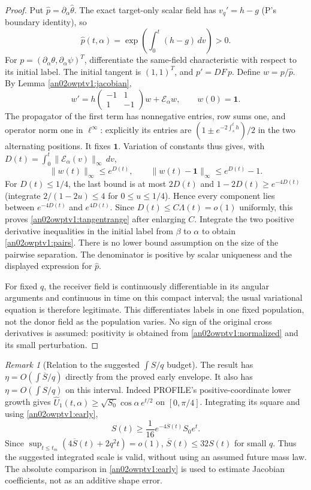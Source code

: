 \documentclass[11pt]{article}
\theoremstyle{remark}\newtheorem{remark}[theorem]{Remark}
\newcommand{\dd}{\,d}
\begin{document}
\begin{proof}
Put $\widehat p=\partial_\alpha\widehat\theta$.
The exact target-only scalar field has
$v_q'=h-g$ (P's boundary identity), so
\[
 \widehat p(t,\alpha)=\exp\!\left(\int_0^t(h-g)\dd v\right)>0.
\]
For $p=(\partial_\alpha\theta,\partial_\alpha\psi)^T$,
differentiate the same-field characteristic with respect to its
initial label. The initial tangent is $(1,1)^T$, and
$p'=DF\,p$. Define $w=p/\widehat p$. By Lemma
\ref{an02owptv1:jacobian},
\begin{equation}\label{an02owptv1:normalized}
 w'=h\begin{pmatrix}-1&1\\1&-1\end{pmatrix}w+
 \mathcal E_\alpha w,\qquad w(0)=\boldsymbol1.
\end{equation}
The propagator of the first term has nonnegative entries, row sums
one, and operator norm one in $\ell^\infty$: explicitly its entries
are $(1\pm e^{-2\int_s^t h})/2$ in the two alternating positions.
It fixes $\boldsymbol1$. Variation of constants thus gives, with
$D(t)=\int_0^t\|\mathcal E_\alpha(v)\|_\infty\dd v$,
\[
 \|w(t)\|_\infty\le e^{D(t)},\qquad
 \|w(t)-\boldsymbol1\|_\infty\le e^{D(t)}-1.
\]
For $D(t)\le1/4$, the last bound is at most $2D(t)$ and
$1-2D(t)\ge e^{-4D(t)}$ (integrate
$2/(1-2u)\le4$ for $0\le u\le1/4$).
Hence every component lies between $e^{-4D(t)}$ and $e^{4D(t)}$.
Since $D(t)\le C\Lambda(t)=o(1)$ uniformly, this proves
\eqref{an02owptv1:tangentrange} after enlarging $C$.
Integrate the two positive derivative inequalities in the initial
label from $\beta$ to $\alpha$ to obtain
\eqref{an02owptv1:pairs}. There is no lower bound assumption on the
size of the pairwise separation. The denominator is positive by
scalar uniqueness and the displayed expression for $\widehat p$.

For fixed $q$, the receiver field is continuously differentiable
in its angular arguments and continuous in time on this compact
interval; the usual variational equation is therefore legitimate.
This differentiates labels in one fixed population, not the donor
field as the population varies. No sign of the original cross
derivatives is assumed: positivity is obtained from
\eqref{an02owptv1:normalized} and its small perturbation.
\end{proof}

\begin{remark}[Relation to the suggested $\int S/q$ budget]
\label{an02owptv1:actualmass}
The result has $\eta=O(\int\overline S/q)$ directly from the proved
early envelope. It also has $\eta=O(\int S/q)$ on this interval.
Indeed PROFILE's positive-coordinate lower growth gives
$\widehat U_1(t,\alpha)\ge\sqrt{S_0}\cos\alpha\,e^{t/2}$ on
$[0,\pi/4]$. Integrating its square and using
\eqref{an02owptv1:early},
\[
 S(t)\ge \frac1{16}e^{-4\overline S(t)}S_0e^t.
\]
Since $\sup_{t\le t_m}(4\overline S(t)+2q^2t)=o(1)$,
$\overline S(t)\le32 S(t)$ for small $q$. Thus the suggested
integrated scale is valid, without using an assumed future mass law.
The absolute comparison in \eqref{an02owptv1:early} is used to
estimate Jacobian coefficients, not as an additive shape error.
\end{remark}
\end{document}
